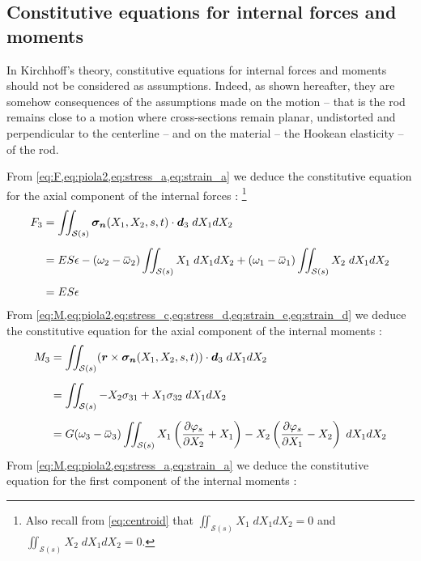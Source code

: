 \subsection{Constitutive equations for internal forces and moments}
In Kirchhoff's theory, constitutive equations for internal forces and moments should not be considered as assumptions. Indeed, as shown hereafter, they are somehow consequences of the assumptions made on the motion -- that is the rod remains close to a motion where cross-sections remain planar, undistorted and perpendicular to the centerline -- and on the material -- the Hookean elasticity -- of the rod.

From \cref{eq:F,eq:piola2,eq:stress_a,eq:strain_a} we deduce the constitutive equation for the axial component of the internal forces : \footnote{Also recall from \cref{eq:centroid} that $\iint_{\mathcal{S}(s)} {X_1} \;dX_1 dX_2 = 0$ and $\iint_{\mathcal{S}(s)} {X_2} \;dX_1 dX_2 = 0$.}
\begin{equation}
	\begin{aligned}
		F_3 &= \iint_{\mathcal{S}(s)} \vect{\sigma_n}(X_1, X_2, s, t) \cdot \vect{d}_3 \;dX_1 dX_2 
		\\[0.5em]
		&= ES\epsilon 
		- (\omega_2 - \overbar{\omega}_2) \iint_{\mathcal{S}(s)} {X_1} \;dX_1 dX_2
		+ (\omega_1 - \overbar{\omega}_1) \iint_{\mathcal{S}(s)} {X_2} \;dX_1 dX_2
		\\[0.5em]
		&= ES\epsilon
	\end{aligned}
\end{equation}
From \cref{eq:M,eq:piola2,eq:stress_c,eq:stress_d,eq:strain_e,eq:strain_d} we deduce the constitutive equation for the axial component of the internal moments : 
\begin{equation}
	\begin{aligned}
		M_3 &= \iint_{\mathcal{S}(s)} (\vect{r} \times \vect{\sigma_n}(X_1, X_2, s, t)) \cdot \vect{d}_3 \;dX_1 dX_2
		\\[0.5em]
		&= \iint_{\mathcal{S}(s)} -X_2\sigma_{31} + X_1\sigma_{32}  \;dX_1 dX_2 
		\\[0.5em]
		&= G (\omega_3 - \overbar{\omega}_3) 
		\iint_{\mathcal{S}(s)} X_1 \left( \frac{\partial \varphi_s}{\partial {X_2}} + X_1 \right ) - X_2 \left( \frac{\partial \varphi_s}{\partial {X_1}}  - X_2 \right )
		 \;dX_1 dX_2 
	\end{aligned}
\end{equation}
From \cref{eq:M,eq:piola2,eq:stress_a,eq:strain_a} we deduce the constitutive equation for the first component of the internal moments : 
